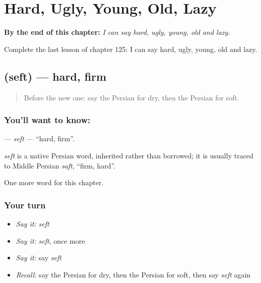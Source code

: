 
\chapter{Hard, Ugly, Young, Old, Lazy}
\label{ch:fa-hard-ugly-young-old-lazy}

\begin{chapteropening}
\textbf{By the end of this chapter:} \emph{I can say hard, ugly, young, old and lazy.}

Complete the last lesson of chapter 125: I can say hard, ugly, young, old and lazy.
\end{chapteropening}

\section[\texorpdfstring{\fa{سفت} (seft)}{سفت (seft)}]{ (seft) — hard, firm}

\label{lesson:FA-C125-seft}



\begin{quote}
Before the new one: say the Persian for dry, then the Persian for soft.
\end{quote}

\subsection*{You'll want to know: }
\textbf{} — \emph{seft} — \textquotedblleft{}hard, firm\textquotedblright{}.

\begin{cousinweb}
\emph{seft} is a native Persian word, inherited rather than borrowed; it is usually traced to Middle Persian \emph{saft}, \textquotedblleft{}firm, hard\textquotedblright{}.
\end{cousinweb}

\begin{grammarlens}[title={What you've built}]
One more word for this chapter.
\end{grammarlens}

\subsection*{Your turn}
\begin{itemize}
\raggedright
  \item \emph{Say it:} \emph{seft}
  \item \emph{Say it:} \emph{seft}, once more
  \item \emph{Say it:} say \emph{seft}
  \item \emph{Recall:} say the Persian for dry, then the Persian for soft, then say \emph{seft} again
\end{itemize}

